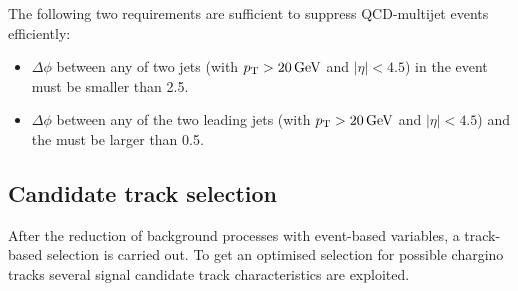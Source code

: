 The following two requirements are sufficient to suppress QCD-multijet events efficiently:
\begin{itemize}
\renewcommand{\labelitemi}{\footnotesize{\ding{118}}}
\item $\Delta\phi$ between any of two jets (with $p_{\text{T}}>20\,\text{Ge}\kern-0.06667em\text{V}$ and $|\eta|<4.5$) in the event must be smaller than 2.5. %
\item $\Delta\phi$ between any of the two leading jets (with $p_{\text{T}}>20\,\text{Ge}\kern-0.06667em\text{V}$ and $|\eta|<4.5$) and the \met must be larger than 0.5. %
\end{itemize}



\subsection{Candidate track selection}
\label{sec:CandidateTrackSelection}
After the reduction of background processes with event-based variables, a track-based selection is carried out.
To get an optimised selection for possible chargino tracks several signal candidate track characteristics are exploited.\\

